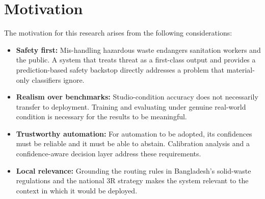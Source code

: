 \section{Motivation}
The motivation for this research arises from the following considerations:
\begin{itemize}
    \item \textbf{Safety first:} Mis-handling hazardous waste endangers sanitation workers and the public. A system that treats threat as a first-class output and provides a prediction-based safety backstop directly addresses a problem that material-only classifiers ignore.

    \item \textbf{Realism over benchmarks:} Studio-condition accuracy does not necessarily transfer to deployment. Training and evaluating under genuine real-world condition is necessary for the results to be meaningful.

    \item \textbf{Trustworthy automation:} For automation to be adopted, its confidences must be reliable and it must be able to abstain. Calibration analysis and a confidence-aware decision layer address these requirements.

    \item \textbf{Local relevance:} Grounding the routing rules in Bangladesh's solid-waste regulations and the national 3R strategy makes the system relevant to the context in which it would be deployed.
\end{itemize}

